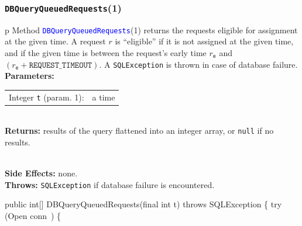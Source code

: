 \documentclass{article}
\theoremstyle{definition}                   %
\begin{document}
\subsubsection{{\tt{}\protect{}DBQueryQueuedRequests}(1)}
\begin{tabular}{p{\textwidth}}
\toprule
{}
Method \textcolor{blue}{{\tt{}\protect{}DBQueryQueuedRequests}}(1) returns the requests
eligible for assignment at the given time. A request $r$ is ``eligible'' if it
is not assigned at the given time, and if the given time is between the
request's early time $r_\texttt{e}$ and
$(r_\texttt{e}+\texttt{REQUEST\_TIMEOUT})$.
A {\tt{}SQLException} is thrown in case of database failure.\\
\midrule
\textbf{Parameters:} \\
\begin{tabular}{lp{116mm}}
Integer {\tt{}t} (param. 1):&a time
\end{tabular}\\
\textbf{Returns:} results of the query flattened into an integer array, or
{\tt{}null} if no results.

\\
\textbf{Side Effects:} none.\\
\textbf{Throws:} {\tt{}SQLException} if database failure is encountered.\\
\bottomrule
\end{tabular}
\nwenddocs{}\endmoddef{}
public int[] DBQueryQueuedRequests(final int t) throws SQLException \{
  try (\LA{}Open \code{}conn\edoc{}~{\nwtagstyle{}}\RA{}) \{
\end{document}
